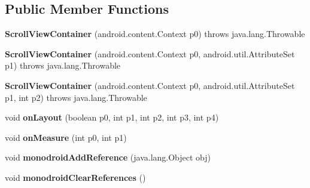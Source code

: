 \subsection*{Public Member Functions}
\begin{DoxyCompactItemize}
\item 
\mbox{\label{classmd5b60ffeb829f638581ab2bb9b1a7f4f3f_1_1ScrollViewContainer_a4da9edc9a3c476f7f6f113c21e94f2c3}} 
{\bfseries Scroll\+View\+Container} (android.\+content.\+Context p0)  throws java.\+lang.\+Throwable 	
\item 
\mbox{\label{classmd5b60ffeb829f638581ab2bb9b1a7f4f3f_1_1ScrollViewContainer_a9988f00f43908c747f96baaaaf9b6220}} 
{\bfseries Scroll\+View\+Container} (android.\+content.\+Context p0, android.\+util.\+Attribute\+Set p1)  throws java.\+lang.\+Throwable 	
\item 
\mbox{\label{classmd5b60ffeb829f638581ab2bb9b1a7f4f3f_1_1ScrollViewContainer_a3daf03644acbaebadff91f69061c392e}} 
{\bfseries Scroll\+View\+Container} (android.\+content.\+Context p0, android.\+util.\+Attribute\+Set p1, int p2)  throws java.\+lang.\+Throwable 	
\item 
\mbox{\label{classmd5b60ffeb829f638581ab2bb9b1a7f4f3f_1_1ScrollViewContainer_a14c4115a2131636e6b15e7327ded3d04}} 
void {\bfseries on\+Layout} (boolean p0, int p1, int p2, int p3, int p4)
\item 
\mbox{\label{classmd5b60ffeb829f638581ab2bb9b1a7f4f3f_1_1ScrollViewContainer_a31ed54d7d9fb3ae0c81c8582a15e49f4}} 
void {\bfseries on\+Measure} (int p0, int p1)
\item 
\mbox{\label{classmd5b60ffeb829f638581ab2bb9b1a7f4f3f_1_1ScrollViewContainer_a36cffa5f672764a8803bbd2b7aada5a0}} 
void {\bfseries monodroid\+Add\+Reference} (java.\+lang.\+Object obj)
\item 
\mbox{\label{classmd5b60ffeb829f638581ab2bb9b1a7f4f3f_1_1ScrollViewContainer_a140e7fc45e7ee876eabd1c71d9a77e80}} 
void {\bfseries monodroid\+Clear\+References} ()
\end{DoxyCompactItemize}
